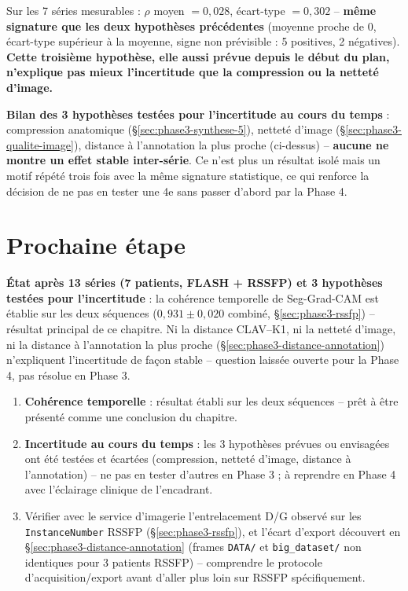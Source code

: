 \documentclass[11pt,a4paper]{report}
\begin{document}
Sur les 7 séries mesurables : $\rho$ moyen $=0{,}028$, écart-type $=0{,}302$ --
\textbf{même signature que les deux hypothèses précédentes} (moyenne proche de 0,
écart-type supérieur à la moyenne, signe non prévisible : 5 positives, 2
négatives). \textbf{Cette troisième hypothèse, elle aussi prévue depuis le début du
plan, n'explique pas mieux l'incertitude que la compression ou la netteté
d'image.}

\textbf{Bilan des 3 hypothèses testées pour l'incertitude au cours du temps} :
compression anatomique (\S\ref{sec:phase3-synthese-5}), netteté d'image
(\S\ref{sec:phase3-qualite-image}), distance à l'annotation la plus proche
(ci-dessus) -- \textbf{aucune ne montre un effet stable inter-série}. Ce n'est plus
un résultat isolé mais un motif répété trois fois avec la même signature
statistique, ce qui renforce la décision de ne pas en tester une 4e sans passer
d'abord par la Phase 4.

\section{Prochaine étape}

\textbf{État après 13 séries (7 patients, FLASH + RSSFP) et 3 hypothèses testées
pour l'incertitude} : la cohérence temporelle de Seg-Grad-CAM est établie sur les
deux séquences ($0{,}931\pm0{,}020$ combiné, \S\ref{sec:phase3-rssfp}) -- résultat
principal de ce chapitre. Ni la distance CLAV--K1, ni la netteté d'image, ni la
distance à l'annotation la plus proche (\S\ref{sec:phase3-distance-annotation})
n'expliquent l'incertitude de façon stable -- question laissée ouverte pour la
Phase 4, pas résolue en Phase 3.

\begin{enumerate}[nosep]
    \item \textbf{Cohérence temporelle} : résultat établi sur les deux séquences --
        prêt à être présenté comme une conclusion du chapitre.
    \item \textbf{Incertitude au cours du temps} : les 3 hypothèses prévues ou
        envisagées ont été testées et écartées (compression, netteté d'image,
        distance à l'annotation) -- ne pas en tester d'autres en Phase 3 ; à
        reprendre en Phase 4 avec l'éclairage clinique de l'encadrant.
    \item Vérifier avec le service d'imagerie l'entrelacement D/G observé sur les
        \texttt{InstanceNumber} RSSFP (\S\ref{sec:phase3-rssfp}), et l'écart
        d'export découvert en \S\ref{sec:phase3-distance-annotation} (frames
        \texttt{DATA/} et \texttt{big\_dataset/} non identiques pour 3 patients
        RSSFP) -- comprendre le protocole d'acquisition/export avant d'aller plus
        loin sur RSSFP spécifiquement.
\end{enumerate}
\end{document}
